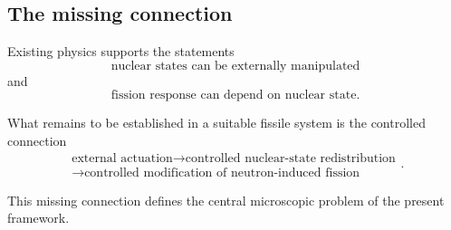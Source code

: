 \subsection{The missing connection}

Existing physics supports the statements
\begin{equation}
\boxed{\text{nuclear states can be externally manipulated}}
\end{equation}
and
\begin{equation}
\boxed{\text{fission response can depend on nuclear state}}.
\end{equation}

What remains to be established in a suitable fissile system is the controlled connection
\begin{equation}
\boxed{
\begin{gathered}
\text{external actuation}
\rightarrow
\text{controlled nuclear-state redistribution}\\
\rightarrow
\text{controlled modification of neutron-induced fission}
\end{gathered}
}.
\end{equation}

This missing connection defines the central microscopic problem of the present framework.
